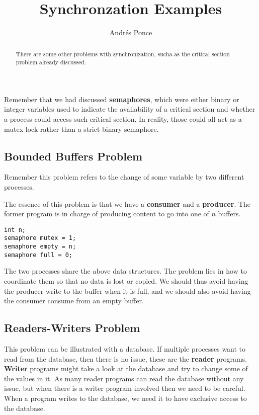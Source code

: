 \documentclass{tufte-handout}
\title{Synchronzation Examples}
\author{Andr\'es Ponce}
\begin{document}
\maketitle
\begin{abstract}

There are some other problems with synchronization, sucha as the critical section problem
already discussed.
\end{abstract}

Remember that we had discussed \textbf{semaphores}, which were either binary or integer 
variables used to indicate the availability of a critical section and whether a process could
access such critical section. In reality, those could all act as a mutex lock rather than a 
strict binary semaphore.

\subsection{Bounded Buffers Problem}
Remember this problem refers to the change of some variable by two different processes.

The essence of this problem is that we have a \textbf{consumer} and a \textbf{producer}.
The former program is in charge of producing content to go into one of $n$ buffers.
\begin{lstlisting}
int n;
semaphore mutex = 1;
semaphore empty = n;
semaphore full = 0;
\end{lstlisting}

The two processes share the above data structures. The problem lies in how to coordinate
them so that no data is lost or copied. We should thus avoid having the producer 
write to the buffer when it is full, and we should also avoid having the consumer
consume from an empty buffer.

\subsection{Readers-Writers Problem}
This problem can be illustrated with a database. If multiple processes want to read 
from the database, then there is no issue, these are the \textbf{reader} programs.
\textbf{Writer} programs might take a look at the database and try to change some of 
the values in it. As many reader programs can read the database without any issue, 
but when there is a writer program involved then we need to be careful. When a program 
writes to the database, we need it to have exclusive access to the database.
\end{document}
